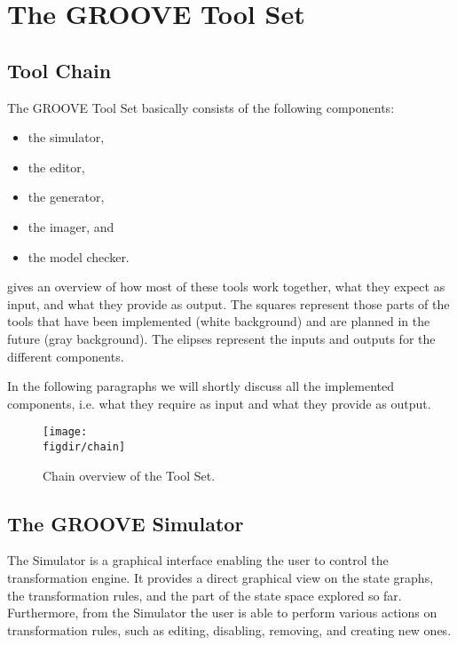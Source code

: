 \chapter{The GROOVE Tool Set}

\section{Tool Chain}

The GROOVE Tool Set basically consists of the following components:

\begin{itemize}
  \item{the simulator,}
  \item{the editor,}
  \item{the generator,}
  \item{the imager, and}
  \item{the model checker.}
\end{itemize}

 gives an overview of how most of these tools work together, what they expect as input, and what they provide as output. The squares represent those parts of the tools that have been implemented (white background) and are planned in the future (gray background). The elipses represent the inputs and outputs for the different components.

In the following paragraphs we will shortly discuss all the implemented components, i.e. what they require as input and what they provide as output.

\begin{figure}
  \centering
  \texttt{[image: \\figdir/chain]}
  \caption{Chain overview of the \GROOVE Tool Set.}
\end{figure}

\section{The GROOVE Simulator}

The \GROOVE Simulator is a graphical interface enabling the user to control the \GROOVE transformation engine. It provides a direct graphical view on the state graphs, the transformation rules, and the part of the state space explored so far. Furthermore, from the Simulator the user is able to perform various actions on transformation rules, such as editing, disabling, removing, and creating new ones.

